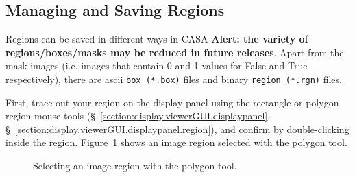 \subsection{Managing and Saving Regions}
\label{section:display.image.rgnmgr}




Regions can be saved in different ways in CASA {\bf Alert: the variety
  of regions/boxes/masks may be reduced in future releases}. Apart
from the mask images (i.e. images that contain 0 and 1 values for
False and True respectively), there are ascii {\tt box (*.box)} files and
binary {\tt region (*.rgn)} files. 

%


First, trace out your region on the display panel using the rectangle or polygon
region mouse tools (\S~\ref{section:display.viewerGUI.displaypanel},
\S~\ref{section:display.viewerGUI.displaypanel.region}), and confirm by
double-clicking inside the region.  Figure~\ref{fig:viewer_rgnselect} shows
an image region selected with the polygon tool.



\begin{figure}[h!]
\begin{center}
\caption{\label{fig:viewer_rgnselect} Selecting an image region with the
polygon tool.}
\hrulefill
\end{center}
\end{figure}


